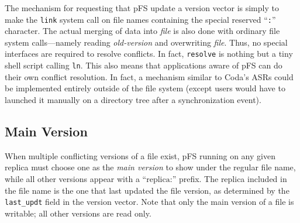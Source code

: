 

The mechanism for requesting that pFS update a version vector is
simply to make the {\tt link} system call on file names containing the
special reserved ``\texttt{:}'' character.  The actual merging of data
into \emph{file} is also done with ordinary file system calls---namely
reading \emph{old-version} and overwriting \emph{file}.  Thus, no
special interfaces are required to resolve conflicts.  In fact,
\texttt{resolve} is nothing but a tiny shell script calling
\texttt{ln}.  This also means that applications aware of pFS can do
their own conflict resolution.  In fact, a mechanism similar to Coda's
ASRs could be implemented entirely outside of the file system (except
users would have to launched it manually on a directory tree after a
synchronization event).




\subsection{Main Version}

When multiple conflicting versions of a file exist, pFS running on any
given replica must choose one as the \emph{main version} to show under
the regular file name, while all other versions appear with a
``$\mathrm{replica}\texttt{:}$'' prefix.  The replica included in the
file name is the one that last updated the file version, as determined
by the \texttt{last\_updt} field in the version vector.  Note that
only the main version of a file is writable; all other versions are
read only.

